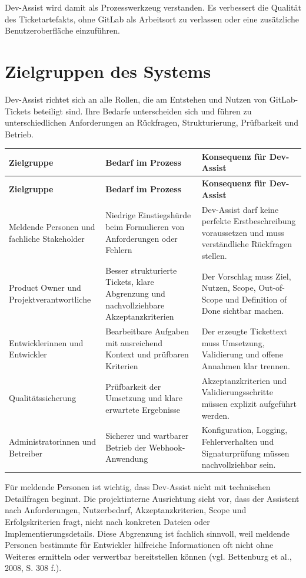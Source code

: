 \documentclass[12pt,a4paper,oneside]{scrreprt}
\newenvironment{longtable}[1]{%
  \par\medskip
  \noindent
  \begin{tabular}{#1}%
}{%
  \end{tabular}
  \par\medskip
}
\begin{document}
Dev-Assist wird damit als Prozesswerkzeug verstanden. Es verbessert die Qualität des Ticketartefakts, ohne GitLab als Arbeitsort zu verlassen oder eine zusätzliche Benutzeroberfläche einzuführen.

\section{Zielgruppen des Systems}

Dev-Assist richtet sich an alle Rollen, die am Entstehen und Nutzen von GitLab-Tickets beteiligt sind. Ihre Bedarfe unterscheiden sich und führen zu unterschiedlichen Anforderungen an Rückfragen, Strukturierung, Prüfbarkeit und Betrieb.

\begin{longtable}{@{}>{\raggedright\arraybackslash}p{0.24\textwidth}>{\raggedright\arraybackslash}p{0.34\textwidth}>{\raggedright\arraybackslash}p{0.34\textwidth}@{}}
\toprule
\textbf{Zielgruppe} & \textbf{Bedarf im Prozess} & \textbf{Konsequenz für Dev-Assist} \\
\midrule
\endfirsthead
\toprule
\textbf{Zielgruppe} & \textbf{Bedarf im Prozess} & \textbf{Konsequenz für Dev-Assist} \\
\midrule
\endhead
Meldende Personen und fachliche Stakeholder & Niedrige Einstiegshürde beim Formulieren von Anforderungen oder Fehlern & Dev-Assist darf keine perfekte Erstbeschreibung voraussetzen und muss verständliche Rückfragen stellen. \\
Product Owner und Projektverantwortliche & Besser strukturierte Tickets, klare Abgrenzung und nachvollziehbare Akzeptanzkriterien & Der Vorschlag muss Ziel, Nutzen, Scope, Out-of-Scope und Definition of Done sichtbar machen. \\
Entwicklerinnen und Entwickler & Bearbeitbare Aufgaben mit ausreichend Kontext und prüfbaren Kriterien & Der erzeugte Tickettext muss Umsetzung, Validierung und offene Annahmen klar trennen. \\
Qualitätssicherung & Prüfbarkeit der Umsetzung und klare erwartete Ergebnisse & Akzeptanzkriterien und Validierungsschritte müssen explizit aufgeführt werden. \\
Administratorinnen und Betreiber & Sicherer und wartbarer Betrieb der Webhook-Anwendung & Konfiguration, Logging, Fehlerverhalten und Signaturprüfung müssen nachvollziehbar sein. \\
\bottomrule
\end{longtable}

Für meldende Personen ist wichtig, dass Dev-Assist nicht mit technischen Detailfragen beginnt. Die projektinterne Ausrichtung sieht vor, dass der Assistent nach Anforderungen, Nutzerbedarf, Akzeptanzkriterien, Scope und Erfolgskriterien fragt, nicht nach konkreten Dateien oder Implementierungsdetails. Diese Abgrenzung ist fachlich sinnvoll, weil meldende Personen bestimmte für Entwickler hilfreiche Informationen oft nicht ohne Weiteres ermitteln oder verwertbar bereitstellen können (vgl. Bettenburg et al., 2008, S. 308 f.).
\end{document}
